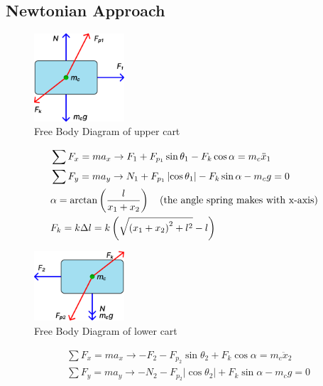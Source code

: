 \documentclass[conference]{IEEEtran}
\begin{document}
\subsection{Newtonian Approach}
\begin{figure}[htbp]
    \centerline{\includegraphics[width=0.3\textwidth]{figures/cart1.png}}
    \caption{Free Body Diagram of upper cart}
    \label{fig:cart1}
\end{figure}

\begin{align}
     & \sum F_x=m a_x \rightarrow F_1 + F_{p_1} \sin \theta_1 - F_k \cos \alpha = m_c \ddot{x}_1     \nonumber            \\
     & \sum F_y=m a_y \rightarrow N_1 + F_{p_1} \left|\cos \theta_1\right| - F_k \sin \alpha - m_c g = 0 \nonumber        \\
     & \alpha = \arctan \left(\frac{l}{x_1+x_2}\right) \quad (\text{\small the angle spring makes with x-axis}) \nonumber \\
     & F_k = k \Delta l = k \left(\sqrt{\left(x_1+x_2\right)^2+l^2}-l\right) \label{eq:newton1}
\end{align}

\begin{figure}[htbp]
    \centerline{\includegraphics[width=0.3\textwidth]{figures/cart2.png}}
    \caption{Free Body Diagram of lower cart}
    \label{fig:cart2}
\end{figure}

\begin{equation}
    \begin{aligned}
         & \sum F_x=m a_x \rightarrow -F_2 - F_{p_2} \sin \theta_2 + F_k \cos \alpha = m_c \ddot{x}_2         \\
         & \sum F_y=m a_y \rightarrow -N_2 - F_{p_2} \left|\cos \theta_2\right| + F_k \sin \alpha - m_c g = 0
    \end{aligned}
\end{equation}
\end{document}
